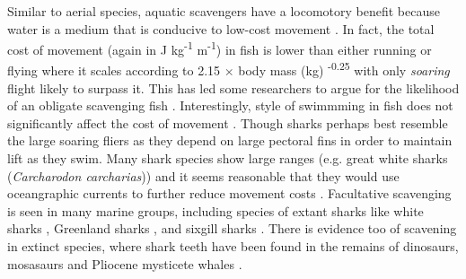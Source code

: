 \documentclass[a4paper,12pt]{article}
\begin{document}
Similar to aerial species, aquatic scavengers have a locomotory benefit because water is a medium that is conducive to low-cost movement \citep{tucker1975energetic}. 
In fact, the total cost of movement (again in J kg\textsuperscript{-1} m\textsuperscript{-1}) in fish is lower than either running or flying where it scales according to 2.15 $\times$ body mass (kg) \textsuperscript{-0.25} \citep{williams1999evolution} with only \textit{soaring} flight likely to surpass it. 
This has led some researchers to argue for the likelihood of an obligate scavenging fish \citep{ruxton2004energetic,ruxton2005searching}. 
Interestingly, style of swimmming in fish does not significantly affect the cost of movement \citep{williams1999evolution}. 
Though sharks perhaps best resemble the large soaring fliers as they depend on large pectoral fins in order to maintain lift as they swim. 
Many shark species show large ranges (e.g. great white sharks (\textit{Carcharodon carcharias})) \citep{bruce2006movements} and it seems reasonable that they would use oceangraphic currents to further reduce movement costs  \citep{ruxton2004energetic}. %
Facultative scavenging is seen in many marine groups, including species of extant sharks like white sharks \citep[known to feed on whale carcasses;][]{fallows2013white}, Greenland sharks \citep[feeding on seals;][]{watanabe2012slowest}, and sixgill sharks \citep{anderson2016impact}.
There is evidence too of scavening in extinct species, where shark teeth have been found in the remains of dinosaurs, mosasaurs and Pliocene mysticete whales \citep[5.3 to 3.6 Mya;]{schwimmer1997scavenging,ehret2009caught}. 


\end{document}
